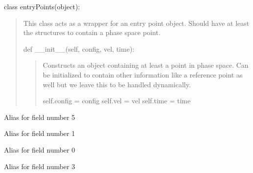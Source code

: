 \documentclass[letterpaper,10pt,english]{sphinxmanual}
\begin{document}
\begin{fulllineitems}
\label{applications/applications.doc:entryPoints.entry_point}
class entryPoints(object):
\begin{quote}

This class acts as a wrapper for an entry point object. Should have at least the structures to contain a phase space point.

def \_\_init\_\_(self, config, vel, time):
\begin{quote}

Constructs an object containing at least a point in phase space. Can be initialized to contain other information like a reference point as well but we leave this to be handled dynamically.

self.config = config
self.vel = vel
self.time = time
\end{quote}
\end{quote}

\begin{fulllineitems}
\label{applications/applications.doc:entryPoints.entry_point.cv}
Alias for field number 5

\end{fulllineitems}


\begin{fulllineitems}
\label{applications/applications.doc:entryPoints.entry_point.p}
Alias for field number 1

\end{fulllineitems}


\begin{fulllineitems}
\label{applications/applications.doc:entryPoints.entry_point.q}
Alias for field number 0

\end{fulllineitems}


\begin{fulllineitems}
\label{applications/applications.doc:entryPoints.entry_point.ref_p}
Alias for field number 3


\end{fulllineitems}
\end{fulllineitems}
\end{document}
